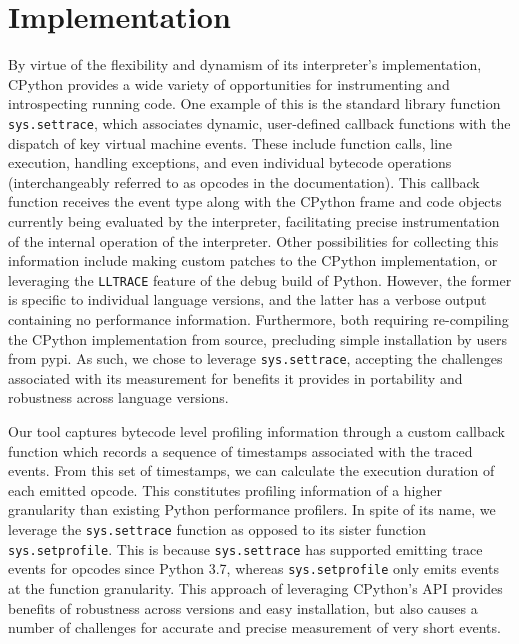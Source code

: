 \section{Implementation}
\label{sec:profiling-bytecode-implementation}

By virtue of the flexibility and dynamism of its interpreter's implementation, CPython provides a wide variety of opportunities for instrumenting and introspecting running code.
One example of this is the standard library function \texttt{sys.settrace}, which associates dynamic, user-defined callback functions with the dispatch of key virtual machine events. These include function calls, line execution, handling exceptions, and even individual bytecode operations (interchangeably referred to as opcodes in the documentation).
This callback function receives the event type along with the CPython frame and code objects currently being evaluated by the interpreter, facilitating precise instrumentation of the internal operation of the interpreter.
Other possibilities for collecting this information include making custom patches to the CPython implementation, or leveraging the \texttt{LLTRACE} feature of the debug build of Python.
However, the former is specific to individual language versions, and the latter has a verbose output containing no performance information. Furthermore, both requiring re-compiling the CPython implementation from source, precluding simple installation by users from \ac{pypi}.
As such, we chose to leverage \texttt{sys.settrace}, accepting the challenges associated with its measurement for benefits it provides in portability and robustness across language versions.

Our tool captures bytecode level profiling information through a custom callback function which records a sequence of timestamps associated with the traced events.
From this set of timestamps, we can calculate the execution duration of each emitted opcode. This constitutes profiling information of a higher granularity than existing Python performance profilers.
In spite of its name, we leverage the \texttt{sys.settrace} function as opposed to its sister function \texttt{sys.setprofile}. This is because \texttt{sys.settrace} has supported emitting trace events for opcodes since Python 3.7, whereas \texttt{sys.setprofile} only emits events at the function granularity.
This approach of leveraging CPython's API provides benefits of robustness across versions and easy installation, but also causes a number of challenges for accurate and precise measurement of very short events.

